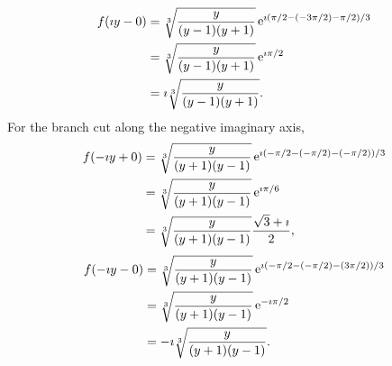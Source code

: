 {\begin{Solution}
\begin{align*}
  \end{align*}
  \begin{align*}
    f(\imath y - 0) &= \sqrt[3]{ \frac{y}{(y-1) (y+1)} } 
    \mathop{\mathrm{e}}\nolimits^{\imath (\pi/2 - (-3 \pi/2) - \pi/2)/3} 
    \\
    &= \sqrt[3]{ \frac{y}{(y-1) (y+1)} } \mathop{\mathrm{e}}\nolimits^{\imath \pi/2} 
    \\
    &= \imath \sqrt[3]{ \frac{y}{(y-1) (y+1)} }.
  \end{align*}
  For the branch cut along the negative imaginary axis,
  \begin{align*}
    f(-\imath y + 0) &= \sqrt[3]{ \frac{y}{(y+1) (y-1)} } 
    \mathop{\mathrm{e}}\nolimits^{\imath (-\pi/2 - (-\pi/2) - (-\pi/2))/3} 
    \\
    &= \sqrt[3]{ \frac{y}{(y+1) (y-1)} }  \mathop{\mathrm{e}}\nolimits^{\imath \pi/6} 
    \\
    &= \sqrt[3]{ \frac{y}{(y+1) (y-1)} }  \frac{\sqrt{3} + \imath}{2},
  \end{align*}
  \begin{align*}
    f(-\imath y - 0) &= \sqrt[3]{ \frac{y}{(y+1) (y-1)} } 
    \mathop{\mathrm{e}}\nolimits^{\imath (-\pi/2 - (-\pi/2) - (3 \pi/2))/3} 
    \\
    &= \sqrt[3]{ \frac{y}{(y+1) (y-1)} }  \mathop{\mathrm{e}}\nolimits^{- \imath \pi/2} 
    \\
    &= -\imath \sqrt[3]{ \frac{y}{(y+1) (y-1)} }.
  \end{align*}
\end{Solution}
}






